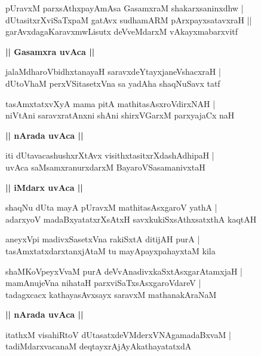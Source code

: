 \documentclass[twoside,12pt,openright]{book}
\newcounter{shloka}[chapter]
\def\uvaca#1{\centerline{{\large\textbf{#1}}}}
\begin{document}
\begin{shloka}%
pUravxM parxsAthxpayAmAsa GasamxraM shakarxsaninxdhw |\\
dUtasitxrXviSaTxpaM gatAvx sudhamARM pArxpayxsatavxraH ||\\
garAvxdagaKaravxmwLisutx deVveMdarxM vAkayxmabarxvitf 
\end{shloka}

\uvaca{|| Gasamxra uvAca ||}

\begin{shloka}%
jalaMdharoVbidhxtanayaH saravxdeYtayxjaneVshacxraH |\\
dUtoVhaM perxVSitasetxVna sa yadAha shaqNuSavx tatf 
\end{shloka}

\begin{shloka}%
tasAmxtatxvXyA mama pitA mathitasAsxroVdirxNAH |\\
niVtAni saravxratAnxni shAni shirxVGarxM parxyajaCx naH 
\end{shloka}

\uvaca{|| nArada uvAca ||}

\begin{shloka}%
iti dUtavacashushxrXtAvx visithxtasitxrXdashAdhipaH |\\
uvAca saMsamxranurxdarxM BayaroVSasamanivxtaH 
\end{shloka}

\uvaca{|| iMdarx uvAca ||}

\begin{shloka}%
shaqNu dUta mayA pUravxM mathitasAsxgaroV yathA |\\
adarxyoV madaBxyatatxrXsAtxH savxkukiSxsAthxsatxthA kaqtAH 
\end{shloka}

\begin{shloka}%
aneyxVpi madivxSasetxVna rakiSxtA ditijAH purA |\\
tasAmxtatxdarxtanxjAtaM tu mayApayxpahayxtaM kila
\end{shloka}

\begin{shloka}%
shaMKoVpeyxVvaM purA deVvAnadivxkaSxtAsxgarAtamxjaH |\\
mamAnujeVna nihataH parxviSaTxsAsxgaroVdareV |\\
tadagxcacx kathayasAvxsayx saravxM mathanakAraNaM 
\end{shloka}

\uvaca{|| nArada uvAca ||}

\begin{shloka}%
itathxM visahiRtoV dUtasatxdeVMderxVNAgamadaBxvaM |\\
tadiMdarxvacanaM deqtayxrAjAyAkathayatatxdA
\end{shloka}
\end{document}
